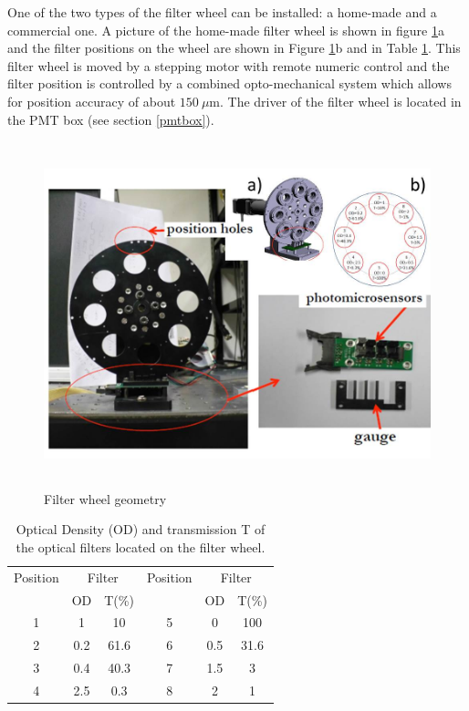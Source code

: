 One of the two types of the filter wheel can be installed: a home-made and a commercial \cite{ref:filterwheel} one. A picture of the home-made filter wheel is shown in figure \ref{fig:x.3}a and the filter
positions on the wheel are shown in Figure \ref{fig:x.3}b and in Table \ref{tab:filterwheelfilt}. This filter wheel is
moved by a stepping motor with remote numeric control and the filter position is
controlled by a combined opto-mechanical system which allows for 
position accuracy of about  $150 ~\mu$m. The driver of the filter wheel is located
in the PMT box (see section \ref{pmtbox}).
% 
\begin{figure}[htb]
\begin{center} 
\includegraphics[height=10cm]{figures/Filter_wheel}
\caption{Filter wheel geometry
}\label{fig:x.3}
\end{center}
\end{figure}
%

\begin{table}[!htpb]
 \begin{center}
\caption{Optical Density (OD) and transmission T of the optical filters located on the filter wheel.}\label{tab:filterwheelfilt}
\begin{tabular}{ccc|ccc}
\hline
Position& \multicolumn{2}{c}{Filter}& Position & \multicolumn{2}{c}{Filter}\\
            & OD & T(\%) & & OD & T(\%)  \\
\hline
1 & 1 & 10 & 5 & 0 & 100 \\
2 & 0.2 & 61.6 &  6 & 0.5 & 31.6\\
3 & 0.4 & 40.3 & 7 &1.5 & 3 \\
4 & 2.5 & 0.3 & 8 & 2 & 1 \\
\hline
\end{tabular}
\end{center}
\end{table}


